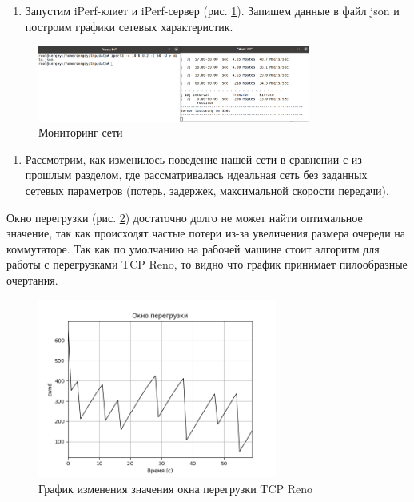 \documentclass[
  13pt,
  fontsize=13pt,
  russian,
  a4paper,
,captions=tableheading
]{scrreprt}
\providecommand{\tightlist}{%
  \setlength{\itemsep}{0pt}\setlength{\parskip}{0pt}}
\begin{document}
\begin{enumerate}
\def\labelenumi{\arabic{enumi}.}
\setcounter{enumi}{3}
\tightlist
\item
  Запустим iPerf-клиет и iPerf-сервер (рис. \ref{fig:0031}). Запишем
  данные в файл json и построим графики сетевых характеристик.
\end{enumerate}

\begin{figure}
\hypertarget{fig:0031}{%
\centering
\includegraphics[width=0.8\textwidth,height=\textheight]{iproute_monitor.png}
\caption{Мониторинг сети}\label{fig:0031}
}
\end{figure}

\begin{enumerate}
\def\labelenumi{\arabic{enumi}.}
\setcounter{enumi}{4}
\tightlist
\item
  Рассмотрим, как изменилось поведение нашей сети в сравнении с из
  прошлым разделом, где рассматривалась идеальная сеть без заданных
  сетевых параметров (потерь, задержек, максимальной скорости передачи).
\end{enumerate}

Окно перегрузки (рис. \ref{fig:0032}) достаточно долго не может найти
оптимальное значение, так как происходят частые потери из-за увеличения
размера очереди на коммутаторе. Так как по умолчанию на рабочей машине
стоит алгоритм для работы с перегрузками TCP Reno, то видно что график
принимает пилообразные очертания.

\begin{figure}
\hypertarget{fig:0032}{%
\centering
\includegraphics[width=0.7\textwidth,height=\textheight]{iproute_cwnd.png}
\caption{График изменения значения окна перегрузки TCP
Reno}\label{fig:0032}
}
\end{figure}
\end{document}

